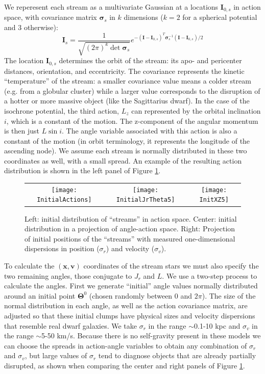 \documentclass[useAMS,usenatbib,a4paper]{mn2e}
\begin{document}
We reperesent each stream as a multivariate Gaussian at a locations $\mathbf{I}_{0,s}$ in action space, with covariance matrix $\mathbf{\sigma}_s$ in $k$ dimensions ($k=2$ for a spherical potential and 3 otherwise): 
\begin{equation}
 \mathbf{I}_s = \frac{1}{\sqrt{(2 \pi)^k \det \mathbf{\sigma}_s}} e^{-(\mathbf{I}-\mathbf{I}_{0,s})^T \mathbf{\sigma}_s^{-1} (\mathbf{I}-\mathbf{I}_{0,s})/2}
\end{equation} 
The location $\mathbf{I}_{0,s}$ determines the orbit of the stream: its apo- and pericenter distances, orientation, and eccentricity. The covariance represents the kinetic ``temperature'' of the stream: a smaller covariance value means a colder stream (e.g. from a globular cluster) while a larger value corresponds to the disruption of a hotter or more massive object (like the Sagittarius dwarf). In the case of the isochrone potential, the third action, $L_z$ can represented by the orbital inclination $i$, which is a constant of the motion. The z-component of the angular momentum is then just $L \sin i$. The angle variable associated with this action is also a constant of the motion (in orbit terminology, it represents the longitude of the ascending node). We assume each stream is normally distributed in these two coordinates as well, with a small spread. An example of the resulting action distribution is shown in the left panel of Figure \ref{fig:initSetup}.
\begin{figure}
 \begin{tabular}{ccc}
\texttt{[image: InitialActions]} & \texttt{[image: InitialJrTheta5]} & \texttt{[image: InitXZ5]}
\end{tabular}
\caption{Left: initial distribution of ``streams'' in action space. Center: initial distribution in a projection of angle-action space. Right: Projection of initial positions of the ``streams'' with measured one-dimensional dispersions in position ($\sigma_r$) and velocity ($\sigma_v$). }
\label{fig:initSetup}
\end{figure}


To calculate the $(\mathbf{x},\mathbf{v})$ coordinates of the stream stars we must also specify the two remaining angles, those conjugate to $J_r$ and $L$. We use a two-step process to calculate the angles. First we generate ``initial'' angle values normally distributed around an initial point $\mathbf{\Theta}^0$ (chosen randomly between 0 and $2\pi$). The size of the normal distribution in each angle, as well as the action covariance matrix, are adjusted so that these initial clumps have physical sizes and velocity dispersions that resemble real dwarf galaxies. We take $\sigma_r$ in the range $\sim$0.1-10 kpc and $\sigma_v$ in the range $\sim$5-50 km/s. Because there is no self-gravity present in these models we can choose the spreads in action-angle variables to obtain any combination of $\sigma_r$ and $\sigma_v$, but large values of $\sigma_r$ tend to diagnose objects that are already partially disrupted, as shown when comparing the center and right panels of Figure \ref{fig:initSetup}.
\end{document}
